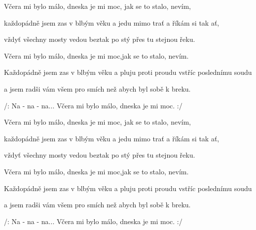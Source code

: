 \zr
Včera mi bylo málo, dneska je mi moc, jak se to stalo, nevím, 

každopádně jsem zas v blbým věku a jedu mimo trať a říkám si tak ať, 

vždyť všechny mosty vedou beztak po stý přes tu stejnou řeku. 
\kr

\zr
Včera mi bylo málo, dneska je mi moc,jak se to stalo, nevím. 

Každopádně jsem zas v blbým věku a pluju proti proudu vstříc poslednímu soudu 

a jsem radši vám všem pro smích než abych byl sobě k breku.



/: Na - na - na... Včera mi bylo málo, dneska je mi moc. :/
\kr

\zr
Včera mi bylo málo, dneska je mi moc, jak se to stalo, nevím, 

každopádně jsem zas v blbým věku a jedu mimo trať a říkám si tak ať, 

vždyť všechny mosty vedou beztak po stý přes tu stejnou řeku.
\kr

\zr
Včera mi bylo málo, dneska je mi moc,jak se to stalo, nevím.

Každopádně jsem zas v blbým věku a pluju proti proudu vstříc poslednímu soudu 

a jsem radši vám všem pro smích než abych byl sobě k breku. 



/: Na - na - na... Včera mi bylo málo, dneska je mi moc. :/
\kr

\kp
